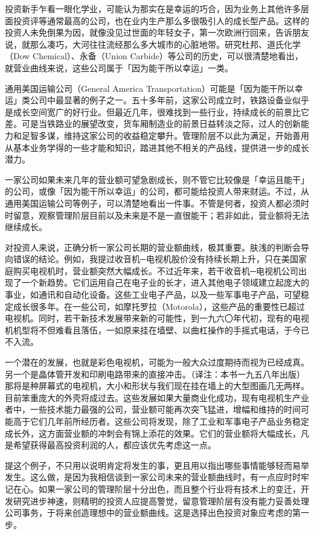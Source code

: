 \documentclass[UTF8,a4paper,zihao=-4,fontset = windows]{ctexart} %
\begin{document}
投资新手乍看一眼化学业，可能认为那实在是幸运的巧合，因为业务上其他许多层面投资评等通常最高的公司，也在业内生产那么多很吸引人的成长型产品。这样的投资人未免倒果为因，就像没见过世面的年轻女子，第一次欧洲行回来，告诉朋友说，就那么凑巧，大河往往流经那么多大城市的心脏地带。研究杜邦、道氏化学（Dow Chemical）、永备（Union Carbide）等公司的历史，可以很清楚地看出，就营业曲线来说，这些公司属于「因为能干所以幸运」一类。

通用美国运输公司（General America Transportation）可能是「因为能干所以幸运」类公司中最显著的例子之一。五十多年前，这家公司成立时，铁路设备业似乎是成长空间宽广的好行业。但最近几年，很难找到一些行业，持续成长的前景比它差。可是当铁路业的展望改变，货车厢制造业的前景日益转淡之际，过人的创新能力和足智多谋，维持这家公司的收益稳定攀升。管理阶层不以此为满足，开始善用从基本业务学得的一些才能和知识，踏进其他不相关的产品线，提供进一步的成长潜力。

一家公司如果未来几年的营业额可望急剧成长，则不管它比较像是「幸运且能干」的公司，或像「因为能干所以幸运」的公司，都可能给投资人带来财运。不过，从通用美国运输公司等例子，可以清楚地看出一件事。不管是何者，投资人都必须时时留意，观察管理阶层目前以及未来是不是一直很能干；若非如此，营业额将无法继续成长。

对投资人来说，正确分析一家公司长期的营业额曲线，极其重要。肤浅的判断会导向错误的结论。例如，我提过收音机─电视机股价没有持续长期上升，只在美国家庭购买电视机时，营业额突然大幅成长。不过近年来，若干收音机─电视机公司出现了一个新趋势。它们运用自己在电子业的长才，进入其他电子领域建立起庞大的事业，如通讯和自动化设备。这些工业电子产品，以及一些军事电子产品，可望稳定成长很多年。在一些公司，如摩托罗拉（Motorola），这些产品的重要性已超过电视机。同时，若干新技术发展带来新的可能性，到一九六〇年代初，现有的电视机机型将不但难看且落伍，一如原来挂在墙壁、以曲杠操作的手摇式电话，于今已不入流。

一个潜在的发展，也就是彩色电视机，可能为一般大众过度期待而视为已经成真。另一个是晶体管开发和印刷电路带来的直接冲击。（译注：本书一九五八年出版）那将是种屏幕式的电视机，大小和形状与我们现在挂在墙上的大型图画几无两样。目前笨重庞大的外壳将成过去。这些发展如果大量商业化成功，现有电视机生产业者中，一些技术能力最强的公司，营业额可能再次突飞猛进，增幅和维持的时间可能高于它们几年前所经历者。这些公司将发现，除了工业和军事电子产品业务稳定成长外，这方面营业额的冲刺会有锦上添花的效果。它们的营业额将大幅成长，凡是希望获得最高投资利润的人，都应该优先考虑这一点。

提这个例子，不只用以说明肯定将发生的事，更且用以指出哪些事情能够轻而易举发生。这么做，是因为我相信谈到一家公司未来的营业额曲线时，有一点应时时牢记在心。如果一家公司的管理阶层十分出色，而且整个行业将有技术上的变迁，开发研究进步神速，则精明的投资人应提高警觉，留意管理阶层有没有能力妥善处理公司事务，于将来创造理想中的营业额曲线。这是选择出色投资对象应考虑的第一步。
\end{document}
